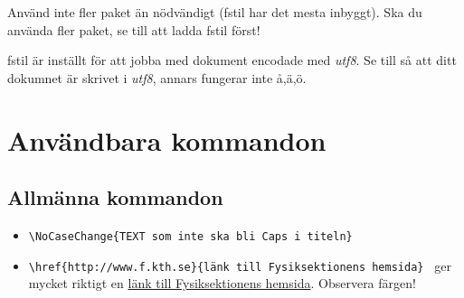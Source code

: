\documentclass[a4paper]{article}
\newcommand{\bs}{\textbackslash}
\begin{document}
Använd inte fler paket än nödvändigt (fstil har det mesta inbyggt). Ska du använda fler paket, se till att ladda fstil först!

fstil är inställt för att jobba med dokument encodade med \textit{utf8}. Se till så att ditt dokumnet är skrivet i \textit{utf8}, annars fungerar inte å,ä,ö.

\section{Användbara kommandon}

\subsection{Allmänna kommandon}
\begin{itemize}
\item \texttt{\bs NoCaseChange\{TEXT som inte ska bli Caps i titeln\} }
\item \texttt{\bs href\{http://www.f.kth.se\}\{länk till Fysiksektionens hemsida\} } ger mycket riktigt en  \href{http://www.f.kth.se}{länk till Fysiksektionens hemsida}. Observera färgen!
\end{itemize}
\end{document}
